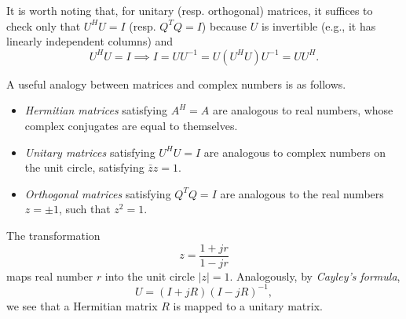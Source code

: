 It is worth noting that, for unitary (resp. orthogonal) matrices, it suffices to check only that $U^H U = I$ (resp. $Q^T Q = I$) because $U$ is invertible (e.g., it has linearly independent columns) and
\[ U^H U = I \implies I = U U^{-1} = U (U^H U) U^{-1} = U U^H. \]

A useful analogy between matrices and complex numbers is as follows.
\begin{itemize}
\item \emph{Hermitian matrices} satisfying $A^H = A$ are analogous to real numbers, whose complex conjugates are equal to themselves.
\item \emph{Unitary matrices} satisfying $U^H U = I$ are analogous to complex numbers on the unit circle, satisfying $\bar{z}z = 1$.
\item \emph{Orthogonal matrices} satisfying $Q^TQ = I$ are analogous to the real numbers $z = \pm 1$, such that $z^2 = 1$.
\end{itemize}

The transformation
\begin{equation*}
z = \frac{1 + jr}{1 - jr}
\end{equation*}
maps real number $r$ into the unit circle $|z| = 1$.
Analogously, by \emph{Cayley's formula},
\begin{equation*}
U = (I + jR) (I - jR)^{-1},
\end{equation*}
we see that a Hermitian matrix $R$ is mapped to a unitary matrix.

